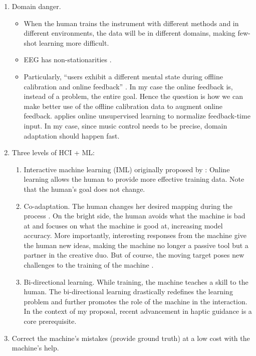\documentclass{article}
\begin{document}
\begin{enumerate}
\begin{itemize}
\end{itemize}
\item \label{itm:domain_danger} Domain danger. 
\begin{itemize}
\item When the human trains the instrument with different methods and in different environments, the data will be in different domains, making few-shot learning more difficult. 
\item EEG has non-stationarities \cite{BCI_calibration_vs_feedback}. 
\item Particularly, “users exhibit a different mental state during offline calibration and online feedback” \cite{cue_co_adaptive_BCI}. In my case the online feedback is, instead of a problem, the entire goal. Hence the question is how we can make better use of the offline calibration data to augment online feedback. \cite{unsupervised_co_adap} applies online unsupervised learning to normalize feedback-time input. In my case, since music control needs to be precise, domain adaptation should happen fast. 
\end{itemize}
\item Three levels of HCI + ML: 
\begin{enumerate}
\item Interactive machine learning (IML) originally proposed by \cite{iml_fails_olsen}: Online learning allows the human to provide more effective training data. Note that the human’s goal does not change. 
\item Co-adaptation. The human changes her desired mapping during the process \cite{fiebrink_model_eval, fiebrink_phd_thesis, fiebrink_wekinator, co_adapt_and_feedback, progressive_co_adapt}. On the bright side, the human avoids what the machine is bad at and focuses on what the machine is good at, increasing model accuracy. More importantly, interesting responses from the machine give the human new ideas, making the machine no longer a passive tool but a partner in the creative duo. But of course, the moving target poses new challenges to the training of the machine \cite{moving_target}. 
\item Bi-directional learning. While training, the machine teaches a skill to the human. The bi-directional learning drastically redefines the learning problem and further promotes the role of the machine in the interaction. In the context of my proposal, recent advancement in haptic guidance \cite{force_mode, zuhequan} is a core prerequisite. 
\end{enumerate}
\item Correct the machine's mistakes (provide ground truth) at a low cost with the machine’s help.

\end{enumerate}
\end{document}
